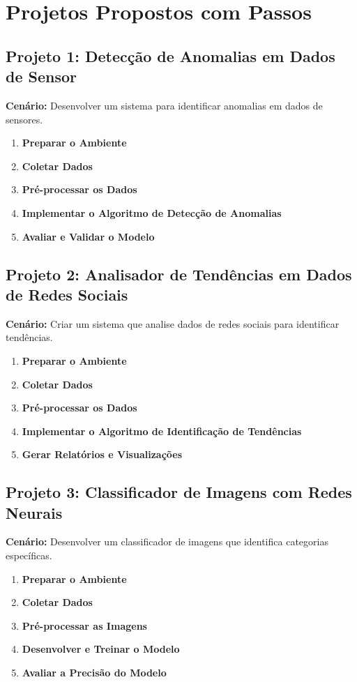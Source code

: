 \documentclass[a4paper,12pt]{book}
\begin{document}
\section{Projetos Propostos com Passos}

\subsection{Projeto 1: Detecção de Anomalias em Dados de Sensor}
\textbf{Cenário:} Desenvolver um sistema para identificar anomalias em dados de sensores.

\begin{enumerate}
  \item \textbf{Preparar o Ambiente}
  \item \textbf{Coletar Dados}
  \item \textbf{Pré-processar os Dados}
  \item \textbf{Implementar o Algoritmo de Detecção de Anomalias}
  \item \textbf{Avaliar e Validar o Modelo}
\end{enumerate}

\subsection{Projeto 2: Analisador de Tendências em Dados de Redes Sociais}
\textbf{Cenário:} Criar um sistema que analise dados de redes sociais para identificar tendências.

\begin{enumerate}
  \item \textbf{Preparar o Ambiente}
  \item \textbf{Coletar Dados}
  \item \textbf{Pré-processar os Dados}
  \item \textbf{Implementar o Algoritmo de Identificação de Tendências}
  \item \textbf{Gerar Relatórios e Visualizações}
\end{enumerate}

\subsection{Projeto 3: Classificador de Imagens com Redes Neurais}
\textbf{Cenário:} Desenvolver um classificador de imagens que identifica categorias específicas.

\begin{enumerate}
  \item \textbf{Preparar o Ambiente}
  \item \textbf{Coletar Dados}
  \item \textbf{Pré-processar as Imagens}
  \item \textbf{Desenvolver e Treinar o Modelo}
  \item \textbf{Avaliar a Precisão do Modelo}
\end{enumerate}
\end{document}
